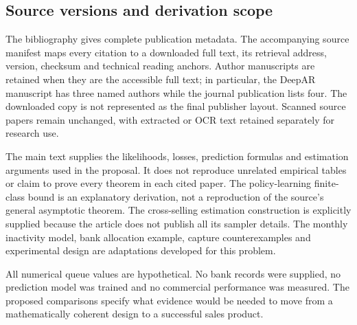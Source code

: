 \subsection{Source versions and derivation scope}

The bibliography gives complete publication metadata. The accompanying source manifest maps every citation to a downloaded full text, its retrieval address, version, checksum and technical reading anchors. Author manuscripts are retained when they are the accessible full text; in particular, the DeepAR manuscript has three named authors while the journal publication lists four. The downloaded copy is not represented as the final publisher layout. Scanned source papers remain unchanged, with extracted or OCR text retained separately for research use.

The main text supplies the likelihoods, losses, prediction formulas and estimation arguments used in the proposal. It does not reproduce unrelated empirical tables or claim to prove every theorem in each cited paper. The policy-learning finite-class bound is an explanatory derivation, not a reproduction of the source's general asymptotic theorem. The cross-selling estimation construction is explicitly supplied because the article does not publish all its sampler details. The monthly inactivity model, bank allocation example, capture counterexamples and experimental design are adaptations developed for this problem.

All numerical queue values are hypothetical. No bank records were supplied, no prediction model was trained and no commercial performance was measured. The proposed comparisons specify what evidence would be needed to move from a mathematically coherent design to a successful sales product.
